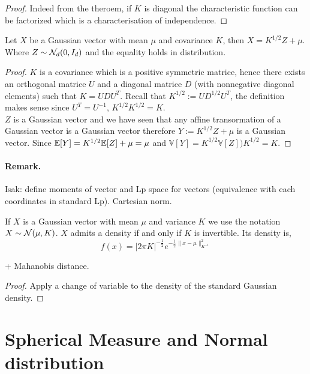 \documentclass{article}
\begin{document}
\begin{proof}
  Indeed from the theroem, if $K$ is diagonal the characteristic function can be
  factorized which is a characterisation of independence. 
\end{proof}

\begin{theorem}
  Let $X$ be a Gaussian vector with mean $\mu$ and covariance $K$, then $X =
  K^{1/2}Z + \mu$. Where $Z \sim \mathcal{N}_d(0,I_d)$ and the equality holds in
  distribution. 
\end{theorem}

\begin{proof}
  $K$ is a covariance which is a positive symmetric matrice, hence there exists an
  orthogonal matrice $U$ and a diagonal matrice $D$ (with nonnegative diagonal
  elements) such that $K = UDU^T$. Recall that $K^{1/2}:= UD^{1/2}U^T$, the
  definition makes sense since $U^T = U^{-1}$, $K^{1/2}K^{1/2} = K$.\\
  $Z$ is a Gaussian vector and we have seen that any affine transormation of a
  Gaussian vector is a Gaussian vector therefore $Y:= K^{1/2}Z + \mu$ is a
  Gaussian vector. Since $\mathbb{E}[Y] =K^{1/2}\mathbb{E}[Z]+\mu = \mu$ and $\mathbb{V}[Y] =
  K^{1/2}\mathbb{V}[Z])K^{1/2} = K$. 
\end{proof}

\paragraph{Remark.} Isak: define moments of vector and Lp space for vectors
(equivalence with each coordinates in standard Lp). Cartesian norm.

\begin{prop}
  If $X$ is a Gaussian vector with mean $\mu$ and variance $K$ we use the
  notation $X \sim \mathcal{N}(\mu,K)$. $X$ admits a density if and only if $K$ is
  invertible. Its density is,
  $$f(x)=|2 \pi K|^{-\frac{1}{2}} e^{-\frac{1}{2}\|x - \mu\|_{K^{-1}}^{2}}$$
\end{prop}

+ Mahanobis distance.

\begin{proof}
  Apply a change of variable to the density of the standard Gaussian density. 
\end{proof}

\section{Spherical Measure and Normal distribution}
\end{document}
